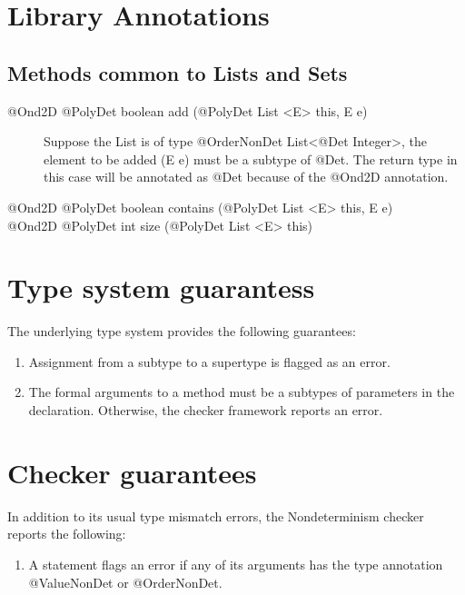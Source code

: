 \section{Library Annotations\label{library-Annotations}}
\subsection{Methods common to Lists and Sets\label{lib-methods}}
\begin{description}
	\item[@Ond2D @PolyDet  boolean add (@PolyDet List <E> this, E e)] Suppose the List is of
	type @OrderNonDet List<@Det Integer>, the element to be added (E e) must be a subtype of @Det.
	The return type in this case will be annotated as @Det because of the @Ond2D annotation.
	\item[@Ond2D @PolyDet  boolean contains (@PolyDet List <E> this, E e)]
	\item[@Ond2D @PolyDet int size (@PolyDet List <E> this)]
\end{description}

\section{Type system guarantess\label{type-system-guarantees}}
The underlying type system provides the following guarantees:
\begin{enumerate}
	\item Assignment from a subtype to a supertype is flagged as an error.
	\item The formal arguments to a method must be a subtypes of parameters in the declaration. Otherwise, the checker framework reports an error.
\end{enumerate}

\section{Checker guarantees\label{error-reporting}}
In addition to its usual type mismatch errors, the Nondeterminism checker reports the following:
\begin{enumerate}
	\item A  statement flags an error if any of its arguments has the type annotation @ValueNonDet or @OrderNonDet.
\end{enumerate}